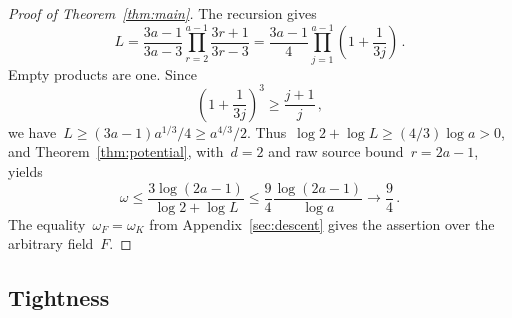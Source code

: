 \documentclass[11pt,letterpaper]{article}
\theoremstyle{definition}
\numberwithin{equation}{section}
\begin{document}
\begin{proof}[Proof of Theorem~\ref{thm:main}]
The recursion gives
\begin{equation}\label{eq:profile-lower}
 L=\frac{3a-1}{3a-3}\prod_{r=2}^{a-1}\frac{3r+1}{3r-3}
 =\frac{3a-1}{4}\prod_{j=1}^{a-1}\left(1+\frac1{3j}\right)\,.
\end{equation}
Empty products are one. Since
\begin{equation*}
 \left(1+\frac1{3j}\right)^3\geq\frac{j+1}{j}\,,
\end{equation*}
we have~$L\geq(3a-1)a^{1/3}/4\geq a^{4/3}/2$. Thus~$\log2+\log L\geq(4/3)\log a>0$, and Theorem~\ref{thm:potential}, with~$d=2$ and raw source bound~$r=2a-1$, yields
\begin{equation}\label{eq:finite-profile-exponent}
 \omega\leq\frac{3\log(2a-1)}{\log2+\log L}
 \leq\frac94\frac{\log(2a-1)}{\log a}
 \longrightarrow\frac94\,.
\end{equation}
The equality~$\omega_F=\omega_K$ from Appendix~\ref{sec:descent} gives the assertion over the arbitrary field~$F$.
\end{proof}

\subsection{Tightness}\label{sec:tightness}
\end{document}
